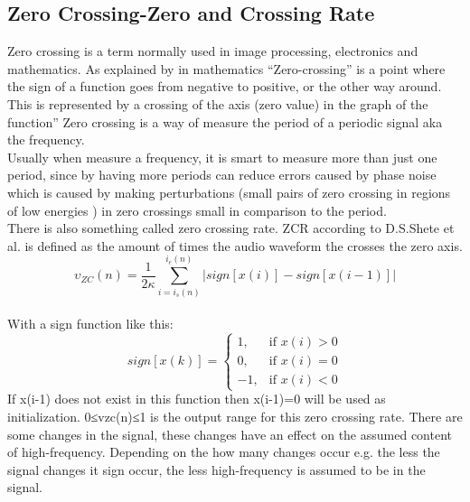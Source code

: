 \subsection{Zero Crossing-Zero and Crossing Rate}
Zero crossing is a term normally used in image processing, electronics and mathematics. As explained by \citep{AlZhrani2010} in mathematics “Zero-crossing” is a point where the sign of a function goes from negative to positive, or the other way around. This is represented by a crossing of the axis (zero value) in the graph of the function” \citep{AlZhrani2010}
Zero crossing is a way of measure the period of a periodic signal aka the frequency\citep{RWW2012}. \\
Usually when measure a frequency, it is smart to measure more than just one period, since by having more periods can reduce errors caused by phase noise which is caused by making perturbations (small pairs of zero crossing in regions of low energies \citep{Mallat1988} ) in zero crossings small in comparison to the period. \citep{RWW2012} \\
There is also something called zero crossing rate. ZCR according to D.S.Shete et al. is defined as the amount of times the audio waveform the crosses the zero axis.\\
\begin{equation}\label{eq:ZCR}
\upsilon_{ZC}(n)= \frac{1}{2 \kappa}\sum_{i=i_s(n)}^{i_e (n)}|sign[x(i)]-sign[x(i-1)]|
\end{equation}
\\
With a sign function like this:
\begin{equation}
sign[x(k)]=
\begin{cases}
 1, & \text{if } x(i)>0\\ 
 0, & \text{if } x(i)=0\\
-1, & \text{if } x(i)<0
\end{cases}
\end{equation}
If x(i-1) does not exist in this function then x(i-1)=0 will be used as initialization. 
0≤vzc(n)≤1 is the output range for this zero crossing rate. There are some changes in the signal, these changes have an effect on the assumed content of high-frequency. Depending on the how many changes occur e.g. the less the signal changes it sign occur, the less high-frequency is assumed to be in the signal. \citep{AlZhrani2010} 

